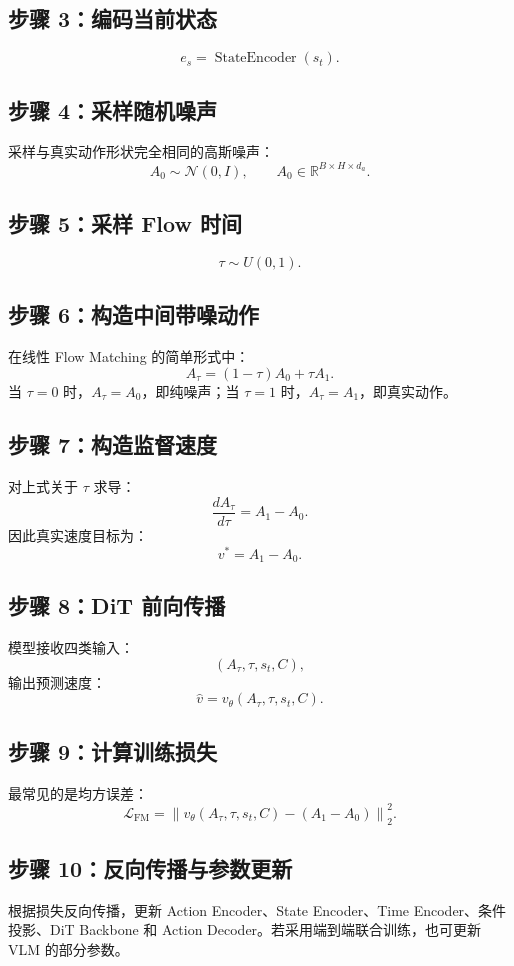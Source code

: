 \documentclass[UTF8,11pt,a4paper]{ctexart}
\begin{document}
\subsection{步骤 3：编码当前状态}
\[
e_s=\operatorname{StateEncoder}(s_t).
\]

\subsection{步骤 4：采样随机噪声}
采样与真实动作形状完全相同的高斯噪声：
\[
A_0\sim\mathcal N(0,I),\qquad A_0\in\mathbb{R}^{B\times H\times d_a}.
\]

\subsection{步骤 5：采样 Flow 时间}
\[
\tau\sim U(0,1).
\]

\subsection{步骤 6：构造中间带噪动作}
在线性 Flow Matching 的简单形式中：
\[
A_\tau=(1-\tau)A_0+\tau A_1.
\]
当 $\tau=0$ 时，$A_\tau=A_0$，即纯噪声；当 $\tau=1$ 时，$A_\tau=A_1$，即真实动作。

\subsection{步骤 7：构造监督速度}
对上式关于 $\tau$ 求导：
\[
\frac{dA_\tau}{d\tau}=A_1-A_0.
\]
因此真实速度目标为：
\[
v^*=A_1-A_0.
\]

\subsection{步骤 8：DiT 前向传播}
模型接收四类输入：
\[
(A_\tau,\tau,s_t,C),
\]
输出预测速度：
\[
\hat v=v_\theta(A_\tau,\tau,s_t,C).
\]

\subsection{步骤 9：计算训练损失}
最常见的是均方误差：
\[
\mathcal L_{\mathrm{FM}}=
\left\|v_\theta(A_\tau,\tau,s_t,C)-(A_1-A_0)\right\|_2^2.
\]

\subsection{步骤 10：反向传播与参数更新}
根据损失反向传播，更新 Action Encoder、State Encoder、Time Encoder、条件投影、DiT Backbone 和 Action Decoder。若采用端到端联合训练，也可更新 VLM 的部分参数。
\end{document}
